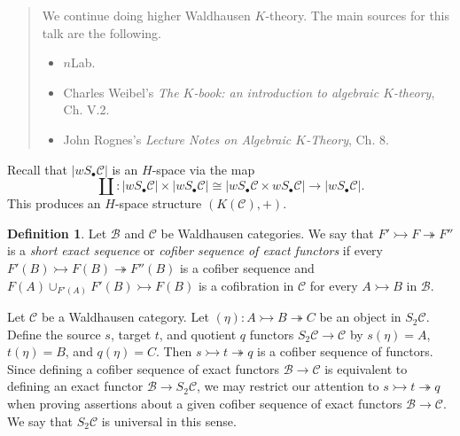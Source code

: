 \documentclass[10pt,letterpaper,cm]{nupset}
\theoremstyle{definition}
\newtheorem{definition}{Definition}
\theoremstyle{theorem}
\theoremstyle{remark}
\newcommand{\1}{\mathbf{1}}
\renewcommand{\b}{\mathscr{B}}
\renewcommand{\c}{\mathscr{C}}
\newcommand{\0}{\vec 0}
\begin{document}
\begin{abstract}
We continue doing higher Waldhausen $K$-theory. The main sources for this talk are the following.
\begin{itemize}
\item $n$Lab.
\item Charles Weibel's \textit{The $K$-book: an introduction to algebraic $K$-theory},  Ch. V.2.
\item John Rognes's \textit{Lecture Notes on Algebraic $K$-Theory}, Ch. 8.
\end{itemize}
\end{abstract}

\smallskip

Recall that $\lvert{wS_{\bullet} \c}\rvert$ is an $H$-space via the map $$\coprod: \lvert{wS_{\bullet} \c}\rvert \times \lvert{wS_{\bullet} \c}\rvert \cong \lvert{wS_{\bullet} \c \times  wS_{\bullet} \c}\rvert\to \lvert{wS_{\bullet} \c}\rvert.$$ This produces an $H$-space structure $\left(K(\c), +\right)$.


\begin{definition}
Let $\b$ and $\c$ be Waldhausen categories. We say that $F' \rightarrowtail F \twoheadrightarrow F''$ is a \textit{short exact sequence} or \textit{cofiber sequence of exact functors} if every $F'(B) \rightarrowtail F(B) \twoheadrightarrow F''(B)$ is a cofiber sequence and $F(A) \cup_{F'(A)} F'(B) \rightarrowtail F(B)$ is a cofibration in $\c$ for every $A \rightarrowtail B$ in $\b$.
\end{definition}

Let $\c$ be a Waldhausen category. Let $(\eta): A \rightarrowtail B \twoheadrightarrow C$ be an object in $S_2\c$. Define the source $s$, target $t$, and quotient $q$ functors $S_2\c \to \c$ by $s(\eta) = A$, $t(\eta) = B$, and $q(\eta) = C$. Then $s \rightarrowtail t \twoheadrightarrow q$ is a cofiber sequence of functors. Since defining a cofiber sequence of exact functors $\b \to \c$ is equivalent to defining an exact functor $\b \to S_2 \c$, we may restrict our attention to $s \rightarrowtail t \twoheadrightarrow q$ when proving assertions about a given cofiber sequence of exact functors $\b \to \c$. We say that $S_2\c$ is universal in this sense.
\end{document}
